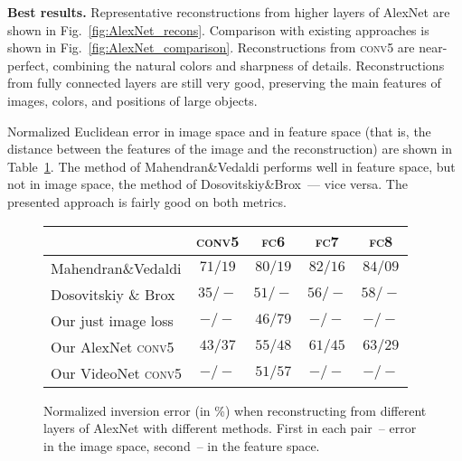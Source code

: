 \documentclass{article}
\newcommand{\conv}{\textsc{conv}}
\newcommand{\fc}{\textsc{fc}}
\begin{document}
\textbf{Best results.}
Representative reconstructions from higher layers of AlexNet are shown in Fig.~\ref{fig:AlexNet_recons}.
Comparison with existing approaches is shown in Fig.~\ref{fig:AlexNet_comparison}.
Reconstructions from \conv5 are near-perfect, combining the natural colors and sharpness of details.
Reconstructions from fully connected layers are still very good, preserving the main features of images, colors, and positions of large objects.

Normalized Euclidean error in image space and in feature space (that is, the distance between the features of the image and the reconstruction) are shown in Table~\ref{tbl:inversion_quant}. 
The method of Mahendran\&Vedaldi performs well in feature space, but not in image space,
the method of Dosovitskiy\&Brox~--- vice versa.
The presented approach is fairly good on both metrics.

\begin{figure}
\begin{center}
\setlength{\tabcolsep}{0.15cm}
\renewcommand{\arraystretch}{1}
\small{
  \begin{tabular}{l|cccc|}
                              & \conv5   & \fc6     & \fc7      & \fc8        \\ \hline
  Mahendran\&Vedaldi          & $71/19$  & $80/19$  & $82/16$   & $84/09$    \\  
  Dosovitskiy \& Brox         & $35/ - $ & $51/ - $ & $56/ - $  & $58/ -  $    \\ \hline
  Our just image loss         & $ -/ -$  & $46/79$  & $ - / - $ & $ - / - $    \\
  Our AlexNet \conv5          & $43/37$  & $55/48$  & $61/45$   & $63/29$    \\  
  Our VideoNet \conv5         & $ -/ -$  & $51/57$  & $ - / - $ & $ - / - $    \\   \hline
   \end{tabular}}
   \vspace{-0.2cm}
\end{center}
   \caption{Normalized inversion error (in \%) when reconstructing from different layers of AlexNet with different methods.
            First in each pair~-- error in the image space, second~-- in the feature space.}
\label{tbl:inversion_quant}
\vspace{-0.2cm}
\end{figure}
\end{document}
